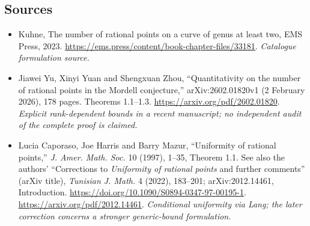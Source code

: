 \documentclass[11pt,a4paper]{article}
\numberwithin{equation}{section}
\begin{document}
\subsection{Sources}
\begin{itemize}\raggedright
\item[\textnormal{[S1]}]\hypertarget{source:statement:1}{} Kuhne, The number of rational points on a curve of genus at least two, EMS Press, 2023.
\url{https://ems.press/content/book-chapter-files/33181}.
{\small\textit{Catalogue formulation source.}}
\item[\textnormal{[E1]}]\hypertarget{extra:statement:1}{} Jiawei Yu, Xinyi Yuan and Shengxuan Zhou, ``Quantitativity on the number of rational points in the Mordell conjecture,'' arXiv:2602.01820v1 (2 February 2026), 178 pages. Theorems 1.1--1.3.
\url{https://arxiv.org/pdf/2602.01820}.
{\small\textit{Explicit rank-dependent bounds in a recent manuscript; no independent audit of the complete proof is claimed.}}
\item[\textnormal{[E2]}]\hypertarget{extra:statement:2}{} Lucia Caporaso, Joe Harris and Barry Mazur, ``Uniformity of rational points,'' \emph{J. Amer. Math. Soc.} 10 (1997), 1--35, Theorem 1.1. See also the authors' ``Corrections to \emph{Uniformity of rational points} and further comments'' (arXiv title), \emph{Tunisian J. Math.} 4 (2022), 183--201; arXiv:2012.14461, Introduction.
\url{https://doi.org/10.1090/S0894-0347-97-00195-1}.
\url{https://arxiv.org/pdf/2012.14461}.
{\small\textit{Conditional uniformity via Lang; the later correction concerns a stronger generic-bound formulation.}}
\end{itemize}
\end{document}
